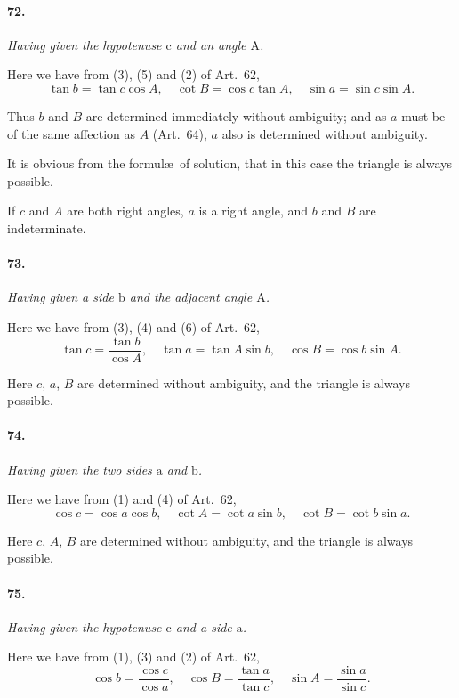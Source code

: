 \documentclass{book}[2004/02/16]
\begin{document}
\begin{mainmatter}
\begin{spacing}{1.3}
\paragraph{72.} \textit{Having given the hypotenuse $\mathrm{c}$ and an angle $\mathrm{A}$.}

Here we have from (3), (5) and (2) of Art.\ 62,
\[
\tan b = \tan c \cos A,\quad \cot B = \cos c \tan A,\quad \sin a = \sin c \sin A.
\]

Thus $b$ and $B$ are determined immediately without ambiguity;
and as $a$ must be of the same affection as $A$ (Art.\ 64), $a$ also is
determined without ambiguity.

It is obvious from the formul\ae\ of solution, that in this case
the triangle is always possible.

If $c$ and $A$ are both right angles, $a$ is a right angle, and $b$ and
$B$ are indeterminate.

\paragraph{73.} \textit{Having given a side $\mathrm{b}$ and the adjacent angle $\mathrm{A}$.}

Here we have from (3), (4) and (6) of Art.\ 62,
\[
\tan c=\dfrac{\tan b}{\cos A},\quad \tan a = \tan A \sin b,\quad \cos B = \cos b \sin A.
\]

Here $c$, $a$, $B$ are determined without ambiguity, and the triangle
is always possible.

\paragraph{74.} \textit{Having given the two sides $\mathrm{a}$ and $\mathrm{b}$.}

Here we have from (1) and (4) of Art.\ 62,
\[
\cos c = \cos a \cos b,\quad \cot A = \cot a \sin b,\quad \cot B = \cot b \sin a.
\]

Here $c$, $A$, $B$ are determined without ambiguity, and the triangle
is always possible.

\paragraph{75.} \textit{Having given the hypotenuse $\mathrm{c}$ and a side $\mathrm{a}$.}

Here we have from (1), (3) and (2) of Art.\ 62,
\[
\cos b=\dfrac{\cos c}{\cos a},\quad \cos B=\dfrac{\tan a}{\tan c},\quad \sin A=\dfrac{\sin a}{\sin c}.
\]


\end{spacing}
\end{mainmatter}
\end{document}
